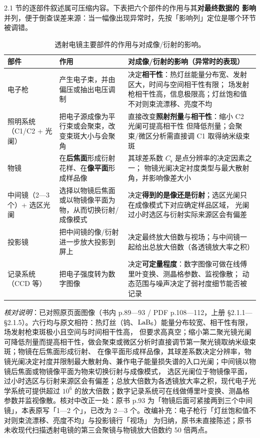 2.1 节的逐部件叙述属可压缩内容。下表把六个部件的作用与其\textbf{对最终数据的
影响}并列，便于倒查误差来源：当一幅像出现异常时，先按「影响列」定位是哪个环节
被调错。

\begin{table}[htbp]
\centering
\caption{透射电镜主要部件的作用与对成像/衍射的影响。}
\label{tab:tem-parts}
{\srcsize
\begin{tabularx}{\columnwidth}{@{}lXX@{}}
\toprule
部件 & 作用 & 对成像/衍射的影响（异常时的表现） \\
\midrule
电子枪 & 产生电子束，并由偏压或抽出电压调制 & 决定\textbf{相干性}：热灯丝能量分布宽、发射区大，时间与空间相干性有限；
场发射枪相干性高，信息极限高；灯丝饱和值不对则束流漂移、亮度不均 \\
照明系统（C1/C2 + 光阑） & 把电子源成像为平行束或会聚束，改变束斑大小与会聚角 & 直接改变\textbf{照射剂量}与\textbf{相干性}：缩小 C2 光阑可提高相干性
但降低剂量；会聚束/微区分析需直接调 C1 取得纳米级束斑 \\
物镜 & 在\textbf{后焦面}形成衍射花样、在\textbf{像平面}形成样品像 & 其球差系数 $C_{\mathrm{s}}$ 是点分辨率的决定因素之一；
物镜光阑决定衬度类型与最大散射角，并影响像差大小 \\
中间镜（2—3 个）+ 选区光阑 & 选择以物镜后焦面或以物镜像平面为物，从而切换衍射/成像模式 & 决定\textbf{得到的是像还是衍射}；选区光阑只在成像模式下对应确定样品区域，
光阑过小时选区与衍射实际来源区会有偏差 \\
投影镜 & 把中间镜的像/衍射进一步放大投影到屏上 & 决定最终放大倍数与视场；与中间镜一起给出总放大倍数（各透镜放大率之积） \\
记录系统（CCD 等） & 把电子强度转为数字图像 & 决定\textbf{可定量程度}：数字图像可做在线傅里叶变换、测晶格参数、监视像散；
动态范围与噪声决定了弱衬度细节能否被记录 \\
\bottomrule
\end{tabularx}}
\end{table}

\emph{核对说明}：已对照原页面图像（书内 p.89—93 / PDF p.108—112，上册 §2.1.1—§2.1.5）。六行均与原文相符：热灯丝（钨、$\ce{LaB6}$）能量分布较宽、相干性有限，场发射枪束斑极小且空间与时间相干性高，
但要求高真空；缩小第二聚光镜光阑可降低剂量而提高相干性，做会聚束或微区分析时直接调节第一聚光镜取纳米级束斑；物镜在后焦面形成衍射、
在像平面形成样品像，其球差系数决定分辨率，物镜光阑决定衬度并限制最大散射角、兼作电子能量损失谱的入口光阑；中间镜以物镜后焦面或物镜像平面为物来切换衍射与成像模式，
选区光阑位于物镜像平面，过小时选区与衍射来源区会有偏差；总放大倍数为各透镜放大率之积，现代电子光学系统可提供超过 $10^{6}$
的放大倍数；数字记录系统可在线做傅里叶变换、测晶格参数并监视像散。核对中改正一处：原书 p.93 为「物镜后面可紧接两到三个中间镜」，本表原写「1—2 个」，已改为 2—3 个。改编补充：电子枪行「灯丝饱和值不对则束流漂移、亮度不均」与投影镜行「视场」
为归纳，原书未直接陈述；原书未收现代扫描透射电镜的第三会聚镜与物镜放大倍数约 50 倍两点。


